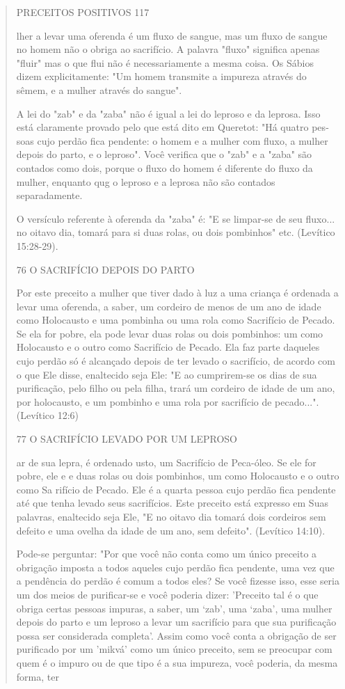\begin{quote}
PRECEITOS POSITIVOS 117

lher a levar uma oferenda é um fluxo de sangue, mas um fluxo de sangue
no homem não o obriga ao sacrifício. A palavra "fluxo" significa apenas
"fluir" mas o que flui não é necessariamente a mesma coisa. Os Sábios
dizem explicita­mente: "Um homem transmite a impureza através do sêmem,
e a mulher atra­vés do sangue".

A lei do "zab" e da "zaba" não é igual a lei do leproso e da leprosa.
Isso está claramente provado pelo que está dito em Queretot: "Há quatro
pes­soas cujo perdão fica pendente: o homem e a mulher com fluxo, a
mulher de­pois do parto, e o leproso". Você verifica que o "zab" e a
"zaba" são contados como dois, porque o fluxo do homem é diferente do
fluxo da mulher, enquan­to qug o leproso e a leprosa não são contados
separadamente.

O versículo referente à oferenda da "zaba" é: "E se limpar-se de seu
fluxo... no oitavo dia, tomará para si duas rolas, ou dois pombinhos"
etc. (Leví­tico 15:28-29).

76 O SACRIFÍCIO DEPOIS DO PARTO

Por este preceito a mulher que tiver dado à luz a uma criança é
orde­nada a levar uma oferenda, a saber, um cordeiro de menos de um ano
de idade como Holocausto e uma pombinha ou uma rola como Sacrifício de
Pecado. Se ela for pobre, ela pode levar duas rolas ou dois pombinhos:
um como Holo­causto e o outro como Sacrifício de Pecado. Ela faz parte
daqueles cujo perdão só é alcançado depois de ter levado o sacrifício,
de acordo com o que Ele disse, enaltecido seja Ele: "E ao cumprirem-se
os dias de sua purificação, pelo filho ou pela filha, trará um cordeiro
de idade de um ano, por holocausto, e um pom­binho e uma rola por
sacrifício de pecado...". (Levítico 12:6)

77 O SACRIFÍCIO LEVADO POR UM LEPROSO

ar de sua lepra, é ordenado usto, um Sacrifício de Peca-óleo. Se ele for
pobre, ele e e duas rolas ou dois pombi­nhos, um como Holocausto e o
outro como Sa rifício de Pecado. Ele é a quarta pessoa cujo perdão fica
pendente até que tenha levado seus sacrifícios. Este pre­ceito está
expresso em Suas palavras, enaltecido seja Ele, "E no oitavo dia to­mará
dois cordeiros sem defeito e uma ovelha da idade de um ano, sem
defei­to". (Levítico 14:10).

Pode-se perguntar: "Por que você não conta como um único pre­ceito a
obrigação imposta a todos aqueles cujo perdão fica pendente, uma vez que
a pendência do perdão é comum a todos eles? Se você fizesse isso, esse
seria um dos meios de purificar-se e você poderia dizer: 'Preceito tal é
o que obriga certas pessoas impuras, a saber, um `zab', uma `zaba', uma
mulher de­pois do parto e um leproso a levar um sacrifício para que sua
purificação possa ser considerada completa'. Assim como você conta a
obrigação de ser purifica­do por um 'mikvá' como um único preceito, sem
se preocupar com quem é o impuro ou de que tipo é a sua impureza, você
poderia, da mesma forma, ter


\end{quote}
